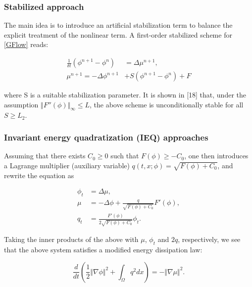 \documentclass{beamer}
\begin{document}
    \begin{frame}
    \frametitle{Stabilized approach}
The main idea is to introduce an artificial stabilization term to balance the explicit treatment of the nonlinear term. A first-order stabilized scheme for \ref{GFlow} reads:

\begin{equation}\label{Stabilized approach}
  \begin{split}
\frac{1}{\delta t}(\phi^{n+1}-\phi^n) &= \Delta \mu^{n+1},\\
\mu^{n+1} = -\Delta\phi^{n+1}&+S(\phi^{n+1}-\phi^n)+F
  \end{split}
\end{equation}

where S is a suitable stabilization parameter. It is shown in [18] that, under the assumption $\Vert F''(\phi)\Vert_\infty\leq L$, the above scheme is unconditionally stable for all $S \geq L_2$.

    \end{frame}
    \begin{frame}
    \frametitle{Invariant energy quadratization (IEQ) approaches}

Assuming that there exists $C_0 \geq 0$ such that $F(\phi) \geq -C_0$, one then introduces a Lagrange multiplier (auxiliary variable) $q(t,x;\phi)=\sqrt{F(\phi)+C_0}$, and rewrite the equation as

\begin{equation}\label{IEQ}
  \begin{split}
\phi_t&=\Delta\mu,\\
\mu&=-\Delta\phi+\frac{q}{\sqrt{F(\phi)+C_0}}F'(\phi),\\
q_t&=\frac{F'(\phi)}{2\sqrt{F(\phi)+C_0}}\phi_t.
  \end{split}
\end{equation}

Taking the inner products of the above with $\mu$, $\phi_t$ and $2q$, respectively, we see that the above system satisfies a modified energy dissipation law:

$$
\frac{d}{dt}(\frac{1}{2}\Vert\nabla\phi\Vert^2+\int_{\Omega}q^2 dx)=-\Vert\nabla\mu\Vert^2.
$$

    \end{frame}
\end{document}
